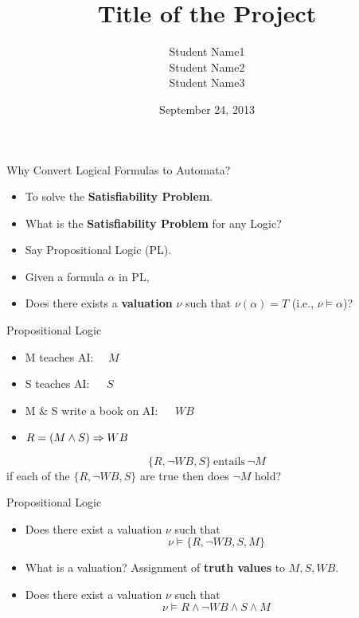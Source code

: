 \documentclass[xcolor=dvipsnames]{beamer}
\title[]{Title of the Project}
\author{Student Name1\\Student Name2\\Student Name3}
\institute[SSNCE]{SSN College of Engineering, Chennai
}
\date{September 24, 2013}
\begin{document}
\begin{frame}
\maketitle
\end{frame}





\begin{frame}{Why Convert Logical Formulas to Automata?}
\pause
\begin{itemize}
\item To solve the {\bf Satisfiability Problem}.
\pause
\item What is the {\bf Satisfiability Problem} for any Logic?
\pause
\item Say Propositional Logic (PL).
\pause
\item Given a formula $\alpha$ in PL, 
\item Does there exists a {\bf valuation} $\nu$ such that $\nu(\alpha)=T$ (i.e., $\nu \models \alpha$)? 
\end{itemize}
\end{frame}
%
\begin{frame}{Propositional Logic}
\begin{itemize}
\item M teaches AI:$~~~~~~M$
\item S teaches AI:$~~~~~~~S$
\item M $\&$ S write a book on AI:$~~~~~~~WB$
%
\pause
\item $R=(M\land S)\Rightarrow WB$
%
\pause

\end{itemize}
\[\{R,\lnot WB,S\}~\mbox{entails}~\lnot M\]
\pause
if each of the $\{R,\lnot WB,S\}$ are true then does $\lnot M$ hold?
\end{frame}

\begin{frame}{Propositional Logic}
\begin{itemize}
\item Does there exist a valuation $\nu$ such that 
\[\nu \models\{R,\lnot WB,S, M\}\]
\pause
\item What is a valuation?
\pause
Assignment of {\bf truth values} to $M,S,WB$.
\pause
\item Does there exist a valuation $\nu$ such that 
\[\nu \models R \land \lnot WB\land S\land M\]
\end{itemize}
\end{frame}
\end{document}

